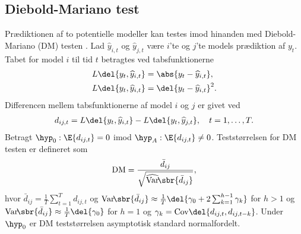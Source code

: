 \subsection{Diebold-Mariano test}
Prædiktionen af to potentielle modeller kan testes imod hinanden med Diebold-Mariano (DM) testen \citep{dmtest}.
Lad \(\widehat{y}_{i,t}\) og \(\widehat{y}_{j,t}\) være \(i\)'te og \(j\)'te models prædiktion af \(y_t\).  
Tabet for model \(i\) til tid \(t\) betragtes ved tabsfunktionerne
\begin{align}
L \del{y_t, \widehat{y}_{i,t}} &= \abs{y_t - \widehat{y}_{i,t}}, \label{eq:lossMAE} \\
L \del{y_t, \widehat{y}_{i,t}} &= \del{y_t - \widehat{y}_{i,t}}^2. \label{eq:lossMSE}
\end{align}
Differencen mellem tabsfunktionerne af model \(i\) og \(j\) er givet ved 
\begin{align*}
d_{ij,t} = L \del{y_t, \widehat{y}_{i,t}} - L \del{y_t, \widehat{y}_{j,t}}, \quad t = 1, \ldots, T.
\end{align*}
%
Betragt \(\hyp_0 : \E{d_{ij,t}} = 0\) imod \(\hyp_A: \E{d_{ij,t}} \neq 0\). Teststørrelsen for DM testen er defineret som
\begin{align*}
\text{DM} = \frac{\bar{d}_{ij}}{\sqrt{\widehat{\mathrm{Var}}\!\sbr{\bar{d}_{ij}}}},
\end{align*}
hvor \(\bar{d}_{ij} = \frac{1}{T} \sum_{t = 1}^T d_{ij,t}\) og 
\(\mathrm{Var}\!\sbr{\bar{d}_{ij}} \approx \frac{1}{T} \del{\gamma_0 + 2 \sum_{k=1}^{h-1} \gamma_k}\) for \(h > 1 \) og \(\mathrm{Var}\!\sbr{\bar{d}_{ij}} \approx \frac{1}{T} \del{\gamma_0}\) for \(h = 1\) og \(\gamma_k = \text{Cov} \del{d_{ij,t}, d_{ij,t-k}}\). 
%
Under \(\hyp_0\) er DM teststørrelsen asymptotisk standard normalfordelt. 
